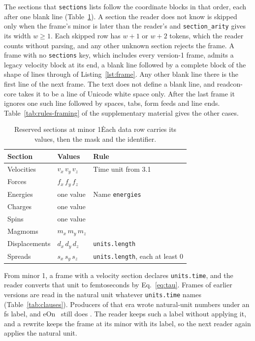 \documentclass[preprint,12pt]{elsarticle}
\begin{document}
The sections that \texttt{sections} lists follow the coordinate blocks
in that order, each after one blank line (Table~\ref{tab:sections}).
A section the reader does not know is skipped only when the frame's
minor is later than the reader's and \texttt{section\_arity} gives its
width \(w\ge1\).
Each skipped row has \(w+1\) or \(w+2\) tokens, which the reader counts
without parsing, and any other unknown section rejects the frame.
A frame with no \texttt{sections} key, which includes every version-1
frame, admits a legacy velocity block at its end, a blank line followed
by a complete block of the shape of lines \wkLineVelocitySymbol{}
through \wkLineLastVelocity{} of Listing~\ref{lst:frame}.
Any other blank line there is the first line of the next frame.
The text does not define a blank line, and readcon-core takes it to be a
line of Unicode white space only.
After the last frame it ignores one such line followed by spaces, tabs,
form feeds and line ends.
Table~\ref*{tab:rules-framing} of the supplementary material gives the
other cases.

\begin{table}[tbp] \centering \small
\caption{Reserved sections at minor 1\. Each data row carries its values, then the mask and the identifier.}
\label{tab:sections}
\begin{tabular}{lll}
\toprule
Section & Values & Rule \\
\midrule
Velocities & \(v_x\, v_y\, v_z\) & Time unit from 3.1 \\
Forces & \(f_x\, f_y\, f_z\) & \\
Energies & one value & Name \texttt{energies} \\
Charges & one value & \\
Spins & one value & \\
Magmoms & \(m_x\, m_y\, m_z\) & \\
Displacements & \(d_x\, d_y\, d_z\) & \texttt{units.length} \\
Spreads & \(s_x\, s_y\, s_z\) & \texttt{units.length}, each at least 0 \\
\bottomrule
\end{tabular}
\end{table}

From minor 1, a frame with a velocity section declares
\texttt{units.time}, and the reader converts that unit to femtoseconds
by Eq.~\eqref{eq:tau}.
Frames of earlier versions are read in the natural unit whatever
\texttt{units.time} names (Table~\ref{tab:clauses}).
Producers of that era wrote natural-unit numbers under an fs label, and
eOn~\eOneEonVersion{} still does
\cite{rohitgoswamiTheochemuieonV3602026}.
The reader keeps such a label without applying it, and a rewrite keeps
the frame at its minor with its label, so the next reader again applies
the natural unit.
\end{document}
